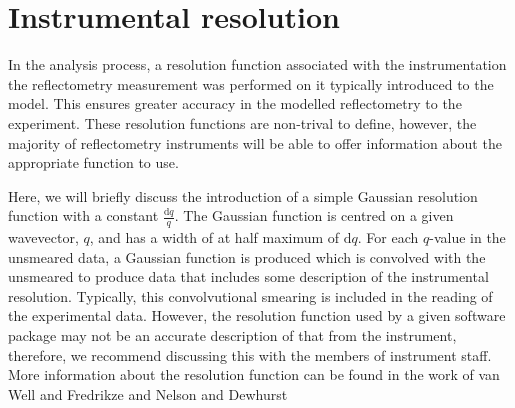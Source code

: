 \documentclass[
 reprint,
 superscriptaddress,
 amsmath,amssymb,
 aps,
]{revtex4-1}
\begin{document}
\section{Instrumental resolution}
In the analysis process, a resolution function associated with the instrumentation the reflectometry measurement was performed on it typically introduced to the model. %
This ensures greater accuracy in the modelled reflectometry to the experiment.
These resolution functions are non-trival to define, however, the majority of reflectometry instruments will be able to offer information about the appropriate function to use.

Here, we will briefly discuss the introduction of a simple Gaussian resolution function with a constant $\frac{\text{d}q}{q}$.
The Gaussian function is centred on a given wavevector, $q$, and has a width of at half maximum of $\text{d}q$.
For each $q$-value in the unsmeared data, a Gaussian function is produced which is convolved with the unsmeared to produce data that includes some description of the instrumental resolution.
Typically, this convolvutional smearing is included in the reading of the experimental data.
However, the resolution function used by a given software package may not be an accurate description of that from the instrument, therefore, we recommend discussing this with the members of instrument staff.
More information about the resolution function can be found in the work of van Well and Fredrikze \cite{vanwell_resolution_2005} and Nelson and Dewhurst \cite{nelson_towards_2013,nelson_towards_2014}
\end{document}
